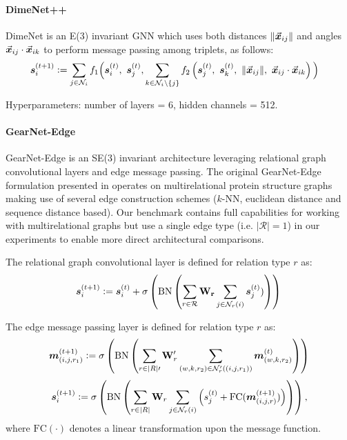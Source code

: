 \paragraph{DimeNet++ \citep{Gasteiger2020directional}}
DimeNet is an E(3) invariant GNN which uses both distances $\Vert \vec{{\bm{x}}}_{ij} \Vert$ and angles $\vec{{\bm{x}}}_{ij} \cdot \vec{{\bm{x}}}_{ik} $ to perform message passing among triplets, as follows:
\begin{align}
    {\bm{s}}_i^{(t+1)} & \vcentcolon= \sum_{j \in \mathcal{N}_i} f_1 \Big( {\bm{s}}_i^{(t)} , \ {\bm{s}}_j^{(t)} , \sum_{k \in \mathcal{N}_i \backslash \{j\}} f_2 \left( {\bm{s}}_j^{(t)} , \ {\bm{s}}_k^{(t)} , \ \Vert \vec{{\bm{x}}}_{ij} \Vert , \ \vec{{\bm{x}}}_{ij} \cdot \vec{{\bm{x}}}_{ik} \right) \Big) \label{eq:dimenet}
\end{align}

Hyperparameters: number of layers = 6, hidden channels = 512.

\paragraph{GearNet-Edge \citep{zhang2023protein}} GearNet-Edge is an SE(3) invariant architecture leveraging relational graph convolutional layers and edge message passing. The original GearNet-Edge formulation presented in \citet{zhang2023protein} operates on multirelational protein structure graphs making use of several edge construction schemes ($k$-NN, euclidean distance and sequence distance based). Our benchmark contains full capabilities for working with multirelational graphs but use a single edge type (i.e. $|\mathcal{R}| = 1$) in our experiments to enable more direct architectural comparisons.

The relational graph convolutional layer is defined for relation type $r$ as: 
\begin{equation}
    {\bm{s}}_{i}^{(t+1)} \vcentcolon= {\bm{s}}_i^{(t)} + \sigma \left(\mathrm{BN}\left( \sum_{r \in \mathcal{R}} \mathbf{W_r} \sum_{j \in \mathcal{N}_{r}(i)} {\bm{s}}_j^{(t)}) \right) \right) \\
\end{equation}

The edge message passing layer is defined for relation type $r$ as:
\begin{equation}
    {\bm{m}}_{(i,j,r_{1})}^{(t+1)} \vcentcolon= \sigma \left( \mathrm{BN} \left( \sum_{r \in {|R|\prime}} \mathbf{W}^{\prime}_r \sum_{(w, k, r_2) \in \mathcal{N}_{r}^{\prime}((i,j,r_{1}))}{\bm{m}}_{(w,k,r_{2})}^{(t)}\right)\right)
\end{equation}
\begin{equation}
    {\bm{s}}_{i}^{(t+1)} \vcentcolon= \sigma \left( \mathrm{BN} \left( \sum_{r \in {|R|}} \mathbf{W}_r \sum_{j \in \mathcal{N}_{r}(i)}\left(s_{j}^{(t)} + \mathrm{FC}({\bm{m}}_{(i,j,r)}^{(t + 1)})\right)\right)\right),
\end{equation}
where $\mathrm{FC(\cdot)}$ denotes a linear transformation upon the message function.

